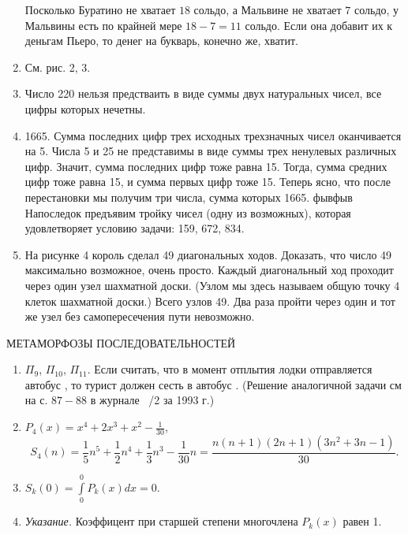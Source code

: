 \documentclass[letterpaper,9pt]{extarticle}
\begin{document}
\begin{multicols*}{2}[]
\begin{enumerate}[leftmargin=*,label=\textbf{\arabic*.},wide, labelwidth=!, labelindent=0pt,noitemsep]
            Посколько Буратино не хватает $18$ сольдо, а Мальвине не хватает $7$ сольдо, у Мальвины есть по крайней мере $18-7=11$ сольдо.
            Если она добавит их к деньгам
            Пьеро, то денег на букварь, конечно же, хватит.
            \item См.
            рис.
            2, 3.
            \item Число 220 нельзя предстваить в виде суммы двух натуральных чисел, все цифры которых нечетны.
            \item 1665.
            Сумма последних цифр трех исходных трехзначных чисел оканчивается на 5.
            Числа 5 и 25 не представимы в виде суммы трех ненулевых различных цифр.
            Значит, сумма последних цифр тоже равна 15.
            Тогда, сумма средних цифр тоже равна 15, и сумма первых цифр тоже 15.
            Теперь ясно, что после перестановки мы получим три числа, сумма которых 1665.
            фывфыв
            Напоследок предъявим тройку чисел (одну из возможных), которая удовлетворяет условию задачи: 159, 672, 834.
            \item На рисунке 4 король сделал 49 диагональных ходов.
            Доказать, что число 49 максимально возможное, очень просто.
            Каждый диагональный ход проходит через один узел шахматной доски.
            (Узлом мы здесь называем общую точку 4 клеток шахматной доски.)
            Всего узлов 49.
            Два раза пройти через один и тот же узел без самопересечения пути невозможно.
        \end{enumerate}
        МЕТАМОРФОЗЫ ПОСЛЕДОВАТЕЛЬНОСТЕЙ
        \begin{enumerate}[leftmargin=*,label=\textbf{\arabic*.},wide, labelwidth=!, labelindent=0pt,noitemsep]
            \item $\Pi_{9}$, $\Pi_{10}$, $\Pi_{11}$.
            Если считать, что в момент отплытия лодки отправляется автобус , то турист должен сесть в автобус .
            (Решение аналогичной задачи см на с. $87-88$ в журнале \guillemotright\ /2 за 1993 г.)
            \item $ \displaystyle P_{4}(x) = x^{4} +2x^{3} + x^{2} - \frac{1}{30}$,
            \[
                S_{4}(n) = \frac{1}{5}n^{5}+\frac{1}{2}n^{4}+\frac{1}{3}n^{3}-\frac{1}{30}n=\frac{n(n+1)(2n+1)(3n^{2}+3n-1)}{30}\text{.}
            \]
            \item $\displaystyle S_{k}(0)= \bm{\int}\limits_0^0 P_{k}(x)dx=0$.
            \item \textit{Указание.} Коэффицент при старшей степени многочлена $P_{k}(x)$ равен 1.

\end{enumerate}
\end{multicols*}
\end{document}
